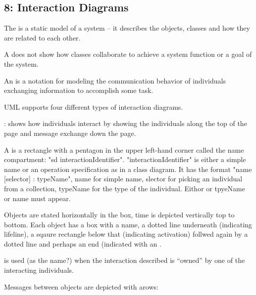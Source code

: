 \subsection{8: Interaction Diagrams}
\begin{compactitem}
\item The  is a static model of a system – it describes the objects, classes and how they are related to each other. 
\item A  does not show how classes collaborate to achieve a system function or a goal of the system.
\item An  is a notation for modeling the communication behavior of individuals exchanging information to accomplish some task.
\item UML supports four different types of interaction diagrams.

\begin{compactitem}
\item {}: shows how individuals interact by showing the individuals along the top of the page and message exchange down the page. 
\begin{compactitem}
\item A  is a rectangle with a pentagon in the upper left-hand corner called the name compartment: "sd interactionIdentifier". 
"interactionIdentifier" is either a simple name or an operation specification as in a class diagram. It has the format "name [selector] : typeName", name for simple name, slector for picking an individual from a collection, typeName for the type of the individual. Eithor or tpyeName or name must appear. 
\item Objects are stated horizontally in the box, time is depicted vertically top to bottom. Each object has a box with a name, a dotted line underneath (indicating lifeline), a sqaure rectangle below that (indicating activation) follwed again by a dotted line and perhaps an end (indicated with an . 
\item {} is used (as the name?) when the interaction described is “owned” by one of the interacting individuals. 
\item Messages between objects are depicted with arows:


\end{compactitem}
\end{compactitem}
\end{compactitem}
